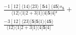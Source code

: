 \documentclass[varwidth, border=5pt]{standalone}
\begin{document}
\begin{my}
$\begin{gathered}
\scriptscriptstyle\frac{-1[12]⟨14⟩⟨23⟩[𝟓4]⟨4𝟓⟩s_{𝟓}}{⟨12⟩⟨1|2+3|1]⟨4|𝟓|4]²} +\\
\scriptscriptstyle\frac{-3[12]⟨23⟩[𝟓|𝟓|1⟩⟨4𝟓⟩}{⟨12⟩⟨1|2+3|1]⟨4|𝟓|4]} \phantom{+}
\end{gathered}$
\end{my}
\end{document}
